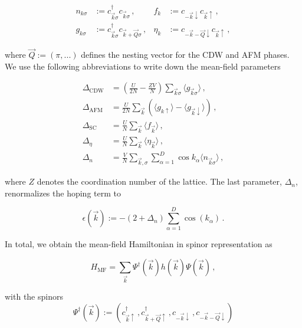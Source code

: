 \documentclass[
    reprint, 
    aps,
    preprintnumbers,
    twocolumn,
    prb,
    superscriptaddress
]{revtex4-2}
\newcommand{\vk}{\vec{k}}
\newcommand{\vQ}{\vec{Q}}
\newcommand{\up}{\uparrow}
\newcommand{\down}{\downarrow}
\newcommand{\kplusQ}{\vk+\vQ}
\newcommand{\kminusQ}{-\vk-\vQ}
\begin{document}
\begin{equation}
    \label{eqn:operators}
    \begin{aligned}
        n_{k\sigma} &:= c_{\vk\sigma}^\dagger c_{\vk\sigma}\,,      &f_k     &:= c_{-\vk\down} c_{\vk\up}\,, \\
        g_{k\sigma} &:= c_{\vk\sigma}^\dagger c_{\vk+\vQ\sigma}\,,  &\eta_k  &:= c_{-\vk-\vQ\down} c_{\vk\up}\,,
    \end{aligned}
\end{equation}

where $\vQ := (\pi, ...)$ defines the nesting vector for the CDW and AFM phases.
We use the following abbreviations to write down the mean-field parameters

\begin{subequations}
    \begin{align}
        \label{eqn:delta_cdw}
        \Delta_\text{CDW} &= \left(\frac{U}{2N} - \frac{ZV}{N}\right) \sum_{\vk\sigma} \langle g_{\vk\sigma} \rangle\,, \\
        \label{eqn:delta_afm}
        \Delta_\text{AFM} &= \frac{U}{2N} \sum_{\vk} \left( \langle g_{k\uparrow} \rangle - \langle g_{\vk\downarrow} \rangle \right)\,, \\
        \Delta_\text{SC} &= \frac{U}{N} \sum_{\vk} \langle f_{\vk} \rangle\,, \\
        \Delta_\eta &= \frac{U}{N} \sum_{\vk} \langle \eta_{\vk} \rangle\,, \\
        \Delta_n &= \frac{V}{N} \sum_{\vk,\sigma} \sum_{\alpha=1}^D \cos k_\alpha \langle n_{\vk\sigma} \rangle\,,
    \end{align}
\end{subequations}

where $Z$ denotes the coordination number of the lattice.
The last parameter, $\Delta_n$, renormalizes the hoping term to

\begin{equation}
    \epsilon( \vk ) := -(2 + \Delta_n) \sum_{\alpha=1}^D \cos(k_\alpha)\,.
\end{equation}

In total, we obtain the mean-field Hamiltonian in spinor representation as

\begin{equation}
    \label{eqn:mf_hamiltonian}
    H_\text{MF} = \sum_{\vk} \Psi^\dagger (\vk) h(\vk) \Psi (\vk)\,,
\end{equation}

with the spinors
\begin{equation}
    \Psi^\dagger (\vk) := \left( c_{\vk\up}^\dagger\,, c_{\kplusQ\up}^\dagger\,, c_{-\vk\down}\,, c_{\kminusQ\down} \right)
\end{equation}
\end{document}
